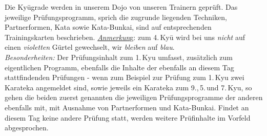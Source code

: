 \documentclass[a5paper,landscape,DIV=calc,11pt,notitlepage]{scrartcl}
\begin{document}
\begin{tcolorbox}[colback=white,colframe=GKD,coltitle=white,adjusted title=Ky\={u}-System im Karate-D\={o}]
\begin{center}
{		Die Ky\={u}grade werden in unserem Dojo von unseren Trainern geprüft. Das jeweilige Prüfungsprogramm, sprich die zugrunde liegenden Techniken, Partnerformen, Kata sowie Kata-Bunkai, sind auf entsprechenden Trainingskarten beschrieben. \textit{\underline{Anmerkun}}g: zum 4.\,Ky\={u} wird bei uns \textit{nicht} auf einen \textit{violetten} Gürtel gewechselt, wir \textit{bleiben} auf \textit{blau}.\\		
		\textit{Besonderheiten:} Der Prüfungsinhalt zum 1.\,Kyu umfasst, zusätzlich zum eigentlichen Programm, ebenfalls die Inhalte der ebenfalls an diesem Tag stattfindenden Prüfungen - wenn zum Beispiel zur Prüfung zum 1.\,Kyu zwei Karateka angemeldet sind, sowie jeweils ein Karateka zum 9.,\,5.\,und 7.\,Kyu, so gehen die beiden zuerst genannten die jeweiligen Prüfungsprogramme der anderen ebenfalls mit, mit Ausnahme von Partnerformen und Kata-Bunkai. Findet an diesem Tag keine andere Prüfung statt, werden weitere Prüfinhalte im Vorfeld abgesprochen.}
	\end{center}\null\vfill\null
	\setlength{\tabcolsep}{6pt}
\end{tcolorbox}
\pagebreak
\end{document}

